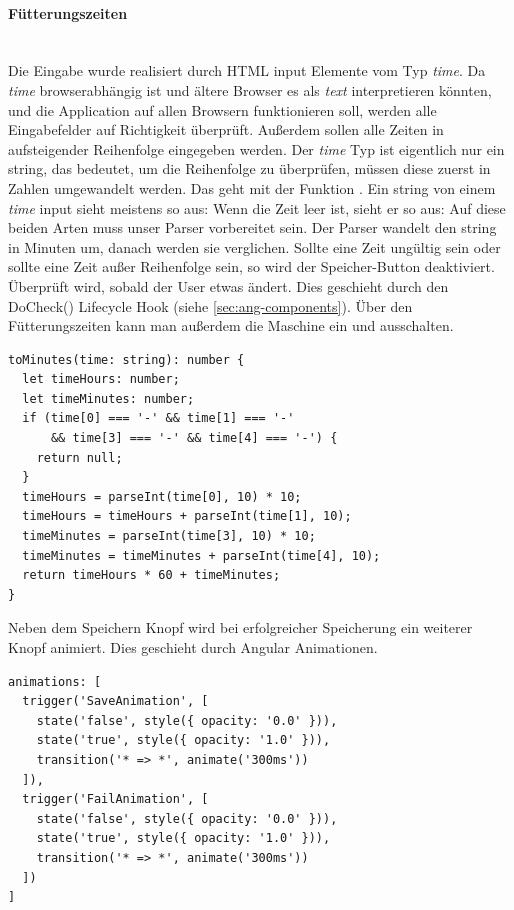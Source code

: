 \paragraph*{Fütterungszeiten}\mbox{}\\
\label{par:funk-fuettr}
Die Eingabe wurde realisiert durch \ac{HTML} input Elemente vom Typ \textit{time}. Da \textit{time} browserabhängig ist und ältere Browser es als \textit{text} interpretieren könnten, und die Application auf allen Browsern funktionieren soll, werden alle Eingabefelder auf Richtigkeit überprüft. Außerdem sollen alle Zeiten in aufsteigender Reihenfolge eingegeben werden. Der \textit{time} Typ ist eigentlich nur ein string, das bedeutet, um die Reihenfolge zu überprüfen, müssen diese zuerst in Zahlen umgewandelt werden. Das geht mit der Funktion . Ein string von einem \textit{time} input sieht meistens so aus:  Wenn die Zeit leer ist, sieht er so aus:  Auf diese beiden Arten muss unser Parser vorbereitet sein. Der Parser wandelt den string in Minuten um, danach werden sie verglichen. Sollte eine Zeit ungültig sein oder sollte eine Zeit außer Reihenfolge sein, so wird der Speicher-Button deaktiviert. Überprüft wird, sobald der User etwas ändert. Dies geschieht durch den DoCheck() Lifecycle Hook (siehe \ref{sec:ang-components}). Über den Fütterungszeiten kann man außerdem die Maschine ein und ausschalten.

\begin{lstlisting}[caption=Zeiten Parser,style=TS,label=zeiten_parser,captionpos=t]
toMinutes(time: string): number {
  let timeHours: number;
  let timeMinutes: number;
  if (time[0] === '-' && time[1] === '-' 
      && time[3] === '-' && time[4] === '-') {
    return null;
  }
  timeHours = parseInt(time[0], 10) * 10;
  timeHours = timeHours + parseInt(time[1], 10);
  timeMinutes = parseInt(time[3], 10) * 10;
  timeMinutes = timeMinutes + parseInt(time[4], 10);
  return timeHours * 60 + timeMinutes;
}
\end{lstlisting}

Neben dem Speichern Knopf wird bei erfolgreicher Speicherung ein weiterer Knopf animiert. Dies geschieht durch Angular Animationen.

\begin{lstlisting}[caption=Animieren des Knopfs,label=button-animation,style=TS]
animations: [
  trigger('SaveAnimation', [
    state('false', style({ opacity: '0.0' })),
    state('true', style({ opacity: '1.0' })),
    transition('* => *', animate('300ms'))
  ]),
  trigger('FailAnimation', [
    state('false', style({ opacity: '0.0' })),
    state('true', style({ opacity: '1.0' })),
    transition('* => *', animate('300ms'))
  ])
]
\end{lstlisting}

